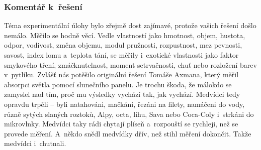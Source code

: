{\ifyearbook
\else
\subsubsection{Komentář k~řešení}

Téma experimentální úlohy bylo zřejmě dost zajímavé, protože vašich řešení došlo nemálo. Měřilo 
se hodně věcí. Vedle  vlastností jako hmotnost, objem, hustota, odpor, vodivost,
změna objemu, modul pružnosti, rozpustnost, mez pevnosti, savost, index lomu a~teplota tání,
se měřily i~exotické vlastnosti jako faktor smykového tření, zmáčknutelnost, moment 
setrvačnosti, chuť nebo rozložení barev v~pytlíku. Zvlášť nás potěšilo originální řešení Tomáše 
Axmana, který měřil absorpci světla pomocí slunečního panelu. Je trochu škoda, že málokdo 
se zamyslel nad tím, proč mu výsledky vychází tak, jak vychází. Medvídci tedy opravdu
trpěli – byli natahováni, mačkáni, řezáni na filety, namáčeni do vody, různě sytých slaných roztoků,
Alpy, octa, lihu, Sava nebo Coca-Coly i~strkáni do mikrovlnky. Medvídci taky rádi chytají 
plíseň a~rozpouští se rychleji, než se provede měření. A~někdo snědl medvídky dřív, než stihl
měření dokončit. Takže medvídci i~chutnali. 
\fi
}

